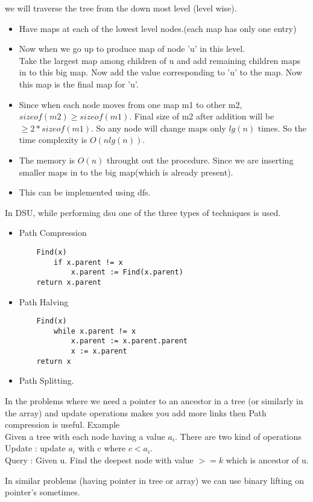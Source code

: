 \documentclass[../Notes.tex]{subfiles}
\begin{document}
we will traverse the tree from the down most level (level wise).

\begin{itemize}
	\item Have maps at each of the lowest level nodes.(each map has only one entry)
	\item Now when we go up to produce map of node 'u' in this level.\\
	Take the largest map among children of u and add remaining children maps in to this big map. Now add the value corresponding to 'u' to the map. Now this map is the final map for 'u'.
	\item Since when each node moves from one map m1 to other m2, $sizeof(m2) \geq sizeof(m1)$. Final size of m2 after addition will be $\geq 2*sizeof(m1)$. So any node will change maps only $lg(n)$ times. So the time complexity is $O(nlg(n))$.
	\item The memory is $O(n)$ throught out the procedure. Since we are inserting smaller maps in to the big map(which is already present).
	\item This can be implemented using dfs.
\end{itemize}

In DSU, while performing dsu one of the three types of techniques is used.
\begin{itemize}
	\item Path Compression \\
	\begin{lstlisting}
	Find(x)
    	if x.parent != x
     		x.parent := Find(x.parent)
	return x.parent
   	\end{lstlisting}
   	
   	\item Path Halving \\
   	\begin{lstlisting}
   	Find(x)
   		while x.parent != x
     		x.parent := x.parent.parent
     		x := x.parent
   	return x
   \end{lstlisting}
   
   \item Path Splitting.
\end{itemize}
In the problems where we need a pointer to an ancestor in a tree (or similarly in the array) and update operations makes you add more links then Path compression is useful. Example \\

Given a tree with each node having a value $a_{i}$. There are two kind of operations\\
Update : update $a_{i}$ with c where $c<a_{i}$.\\
Query : Given u. Find the deepest node with value $>= k$ which is ancestor of u.

In similar problems (having pointer in tree or array) we can use binary lifting on pointer's sometimes.
\end{document}
